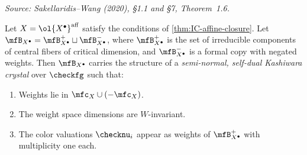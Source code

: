\begin{theorem}
  \label{thm:crystal}
%
  \textit{Source: Sakellaridis--Wang (2020), §1.1 and §7, Theorem~1.6.}

  Let \( X = \ol{X^\bullet}^{\mathrm{aff}} \) satisfy the conditions of
  \cref{thm:IC-affine-closure}.
  Let \( \mfB_{X^\bullet} = \mfB_{X^\bullet}^+ \sqcup \mfB_{X^\bullet}^- \), where
  \( \mfB_{X^\bullet}^+ \) is the set of irreducible components of central fibers of
  critical dimension, and \( \mfB_{X^\bullet}^- \) is a formal copy with negated weights.
  Then \( \mfB_{X^\bullet} \) carries the structure of a \emph{semi-normal, self-dual
  Kashiwara crystal} over \( \checkfg \) such that:
  \begin{enumerate}
    \item Weights lie in \( \mfc_X \cup (-\mfc_X) \).
    \item The weight space dimensions are \( W \)-invariant.
    \item The color valuations \( \checknu_i \) appear as weights of \( \mfB_{X^\bullet}^+ \)
          with multiplicity one each.
  \end{enumerate}
\end{theorem}

